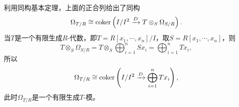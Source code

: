 利用同构基本定理，上面的正合列给出了同构
\[
	\Omega_{T/R}\cong \operatorname{coker}\left(I/I^2\xrightarrow{D} T\otimes_S\Omega_{S/R}\right).
\]
当$T$是一个有限生成$R$-代数，即$T=R[x_1,\cdots,x_n]/I$，取$S=R[x_1,\cdots,x_n]$，则
\[
	T\otimes_S\Omega_{S/R}=T\otimes_S\bigoplus_{i=1}^n Sx_i=\bigoplus_{i=1}^n Tx_i,
\]
所以
\[
	\Omega_{T/R}\cong \operatorname{coker}\left(I/I^2\xrightarrow{D} \bigoplus_{i=1}^n Tx_i\right),
\]
此时$\Omega_{T/R}$是一个有限生成$T$-模。
